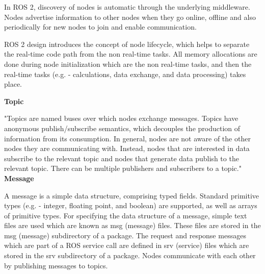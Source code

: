 \documentclass[%
xelatex,
	oneside,		%
	12pt,			%
	parskip=half,	%
	abstracton,
	chapterprefix=true%
    appendixprefix=true]
{scrbook}
\begin{document}
In ROS 2, discovery of nodes is automatic through the underlying middleware. Nodes advertise information to other nodes when they go online, offline and also periodically for new nodes to join and enable communication. 

ROS 2 design introduces the concept of node lifecycle, which helps to separate the real-time code path from the non real-time tasks. All memory allocations are done during node initialization which are the non real-time tasks, and then the real-time tasks (e.g. - calculations, data exchange, and data processing) takes place. 


\vspace*{0.4cm}
	{\bfseries Topic}
	
	
	\vspace*{0.4cm}
	"Topics are named buses over which nodes exchange messages. Topics have anonymous publish/subscribe semantics, which decouples the production of information from its consumption. In general, nodes are not aware of the other nodes they are communicating with. Instead, nodes that are interested in data subscribe to the relevant topic and nodes that generate data publish to the relevant topic. There can be multiple publishers and subscribers to a topic." \cite{topic}
\clearpage
	{\bfseries Message}
	
	
	\vspace*{0.5cm}
A message is a simple data structure, comprising typed fields. Standard primitive types (e.g. - integer, floating point, and boolean) are supported, as well as arrays of primitive types. For specifying the data structure of a message, simple text files are used which are known as msg (message) files. These files are stored in the msg (message) subdirectory of a package. The request and response messages which are part of a ROS service call are defined in srv (service) files which are stored in the srv subdirectory of a package. Nodes communicate with each other by publishing messages to topics.\cite{messages}
\end{document}
